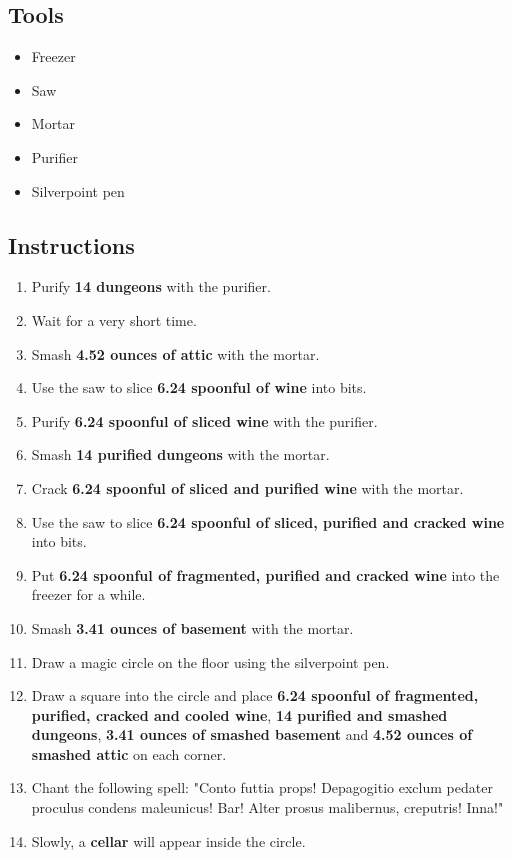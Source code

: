 \documentclass{article}
\begin{document}
\subsection{Tools}\begin{itemize}
\item 
Freezer
\item 
Saw
\item 
Mortar
\item 
Purifier
\item 
Silverpoint pen
\end{itemize}
\subsection{Instructions}\begin{enumerate}
\item 
Purify \textbf{14 dungeons} with the purifier.
\item 
Wait for a very short time.
\item 
Smash \textbf{4.52 ounces of attic} with the mortar.
\item 
Use the saw to slice \textbf{6.24 spoonful of wine} into bits.
\item 
Purify \textbf{6.24 spoonful of sliced wine} with the purifier.
\item 
Smash \textbf{14 purified dungeons} with the mortar.
\item 
Crack \textbf{6.24 spoonful of sliced and purified wine} with the mortar.
\item 
Use the saw to slice \textbf{6.24 spoonful of sliced, purified and cracked wine} into bits.
\item 
Put \textbf{6.24 spoonful of fragmented, purified and cracked wine} into the freezer for a while.
\item 
Smash \textbf{3.41 ounces of basement} with the mortar.
\item 
Draw a magic circle on the floor using the silverpoint pen.
\item 
Draw a square into the circle and place \textbf{6.24 spoonful of fragmented, purified, cracked and cooled wine}, \textbf{14 purified and smashed dungeons}, \textbf{3.41 ounces of smashed basement} and \textbf{4.52 ounces of smashed attic} on each corner.
\item 
Chant the following spell: "Conto futtia props! Depagogitio exclum pedater proculus condens maleunicus! Bar! Alter prosus malibernus, creputris! Inna!"
\item 
Slowly, a \textbf{cellar} will appear inside the circle.
\end{enumerate}
\newpage
\end{document}
